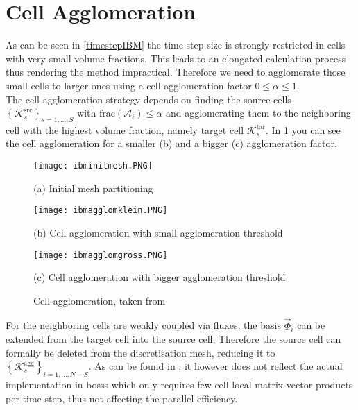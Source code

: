 	\section{Cell Agglomeration}
	\label{cellAgglomeration}
	As can be seen in \eqref{timestepIBM} the time step size is strongly restricted in cells with very small volume fractions. This leads to an elongated calculation process thus rendering the method impractical. Therefore we need to agglomerate those small cells to larger ones using a cell agglomeration factor $0 \leq \alpha \leq 1$. \\
	The cell agglomeration strategy depends on finding the source cells $\left\{\mathcal{K}_s^\text{src} \right\}_{s=1,...,S}$ with $\text{frac}(\mathcal{A}_i) \leq \alpha$ and agglomerating them to the neighboring cell with the highest volume fraction, namely target cell $\mathcal{K}_s^\text{tar}$. In \cref{fig:agglomeration} you can see the cell agglomeration for a smaller (b) and a bigger (c) agglomeration factor. \\
	\begin{figure}[htp]
		\centering
		\begin{minipage}[b]{0.3\textwidth}
			\centering
			\texttt{[image: ibminitmesh.PNG]}
			\caption*{(a) Initial mesh partitioning \newline \newline}
			\label{fig:init}
		\end{minipage}%
		\begin{minipage}[b]{0.3\textwidth}
			\centering
			\texttt{[image: ibmagglomklein.PNG]}
			\caption*{(b) Cell agglomeration with small agglomeration threshold}
			\label{fig:agglomgklein}
		\end{minipage}
		\begin{minipage}[b]{0.3\textwidth}
			\centering
			\texttt{[image: ibmagglomgross.PNG]}
			\caption*{(c) Cell agglomeration with bigger agglomeration threshold}
			\label{fig:agglomgross}
		\end{minipage}%
		\caption{Cell agglomeration, taken from \cite{paper}}\label{fig:agglomeration}
	\end{figure}
	
	For the neighboring cells are weakly coupled via fluxes, the basis $\vec{\Phi}_i$ can be extended from the target cell into the source cell. Therefore the source cell can formally be deleted from the discretisation mesh, reducing it to $\left\{\mathcal{K}_s^\text{agg} \right\}_{i=1,...,N-S}$.
	As can be found in \cite{paper}, it however does not reflect the actual implementation in \gls{bosss} which only requires few cell-local matrix-vector products per time-step, thus not affecting the parallel efficiency.
	
